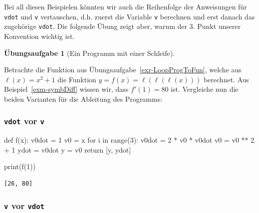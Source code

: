 \documentclass[
  letterpaper,
  DIV=11,
  oneside]{scrreprt}
\newenvironment{Shaded}{\begin{snugshade}}{\end{snugshade}}
\newcommand{\BuiltInTok}[1]{\textcolor[rgb]{0.00,0.23,0.31}{#1}}
\newcommand{\ControlFlowTok}[1]{\textcolor[rgb]{0.00,0.23,0.31}{#1}}
\newcommand{\DecValTok}[1]{\textcolor[rgb]{0.68,0.00,0.00}{#1}}
\newcommand{\KeywordTok}[1]{\textcolor[rgb]{0.00,0.23,0.31}{#1}}
\newcommand{\NormalTok}[1]{\textcolor[rgb]{0.00,0.23,0.31}{#1}}
\newcommand{\OperatorTok}[1]{\textcolor[rgb]{0.37,0.37,0.37}{#1}}
\theoremstyle{definition}
\newtheorem{exercise}{Übungsaufgabe}[chapter]
\theoremstyle{definition}
\theoremstyle{remark}
\begin{document}
Bei all diesen Beispielen könnten wir auch die Reihenfolge der
Anweisungen für \texttt{vdot} und \texttt{v} vertauschen, d.h. zuerst
die Variable \texttt{v} berechnen und erst danach das zugehörige
\texttt{vdot}. Die folgende Übung zeigt aber, warum der 3. Punkt unserer
Konvention wichtig ist.

\leavevmode{}%
\begin{exercise}[Ein Programm mit einer
Schleife]\label{exr-SADmitSchleife}

Betrachte die Funktion aus Übungsaufgabe~\ref{exr-LoopProgToFun}, welche
aus \(\ell(x) = x^2 + 1\) die Funktion
\(y = f(x) = \ell(\ell(\ell(x)))\) berechnet. Aus
Beispiel~\ref{exm-symbDiff} wissen wir, dass \(f'(1) = 80\) ist.
Vergleiche nun die beiden Varianten für die Ableitung des Programms:

\hypertarget{vdot-vor-v}{%
\subsubsection*{\texorpdfstring{\texttt{vdot} vor
\texttt{v}}{vdot vor v}}\label{vdot-vor-v}}

\begin{Shaded}
\begin{Highlighting}[]
\KeywordTok{def}\NormalTok{ f(x):}
\NormalTok{    v0dot }\OperatorTok{=} \DecValTok{1}
\NormalTok{    v0 }\OperatorTok{=}\NormalTok{ x}
    \ControlFlowTok{for}\NormalTok{ i }\KeywordTok{in} \BuiltInTok{range}\NormalTok{(}\DecValTok{3}\NormalTok{):}
\NormalTok{        v0dot }\OperatorTok{=} \DecValTok{2} \OperatorTok{*}\NormalTok{ v0 }\OperatorTok{*}\NormalTok{ v0dot}
\NormalTok{        v0 }\OperatorTok{=}\NormalTok{ v0 }\OperatorTok{**} \DecValTok{2} \OperatorTok{+} \DecValTok{1}
\NormalTok{    ydot }\OperatorTok{=}\NormalTok{ v0dot}
\NormalTok{    y }\OperatorTok{=}\NormalTok{ v0}
    \ControlFlowTok{return}\NormalTok{ [y, ydot]}

\BuiltInTok{print}\NormalTok{(f(}\DecValTok{1}\NormalTok{))}
\end{Highlighting}
\end{Shaded}

\begin{verbatim}
[26, 80]
\end{verbatim}

\hypertarget{v-vor-vdot}{%
\subsubsection*{\texorpdfstring{\texttt{v} vor
\texttt{vdot}}{v vor vdot}}\label{v-vor-vdot}}


\end{exercise}
\end{document}
